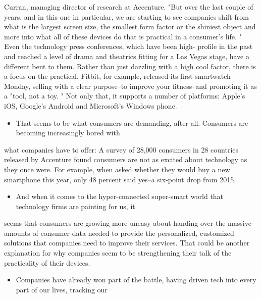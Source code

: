 \documentclass[UTF8,11pt]{ctexart}
\begin{document}
Curran, managing director of research at Accenture. "But over the last couple of years, and in this one in particular, we are starting to see companies shift from what is the largest screen size, the smallest form factor or the shiniest object and more into what all of these devices do that is practical in a consumer's life. " Even the technology press conferences, which have been high- profile in the past and reached a level of drama and theatrics fitting for a Las Vegas stage, have a different bent to them. Rather than just dazzling with a high cool factor, there is a focus on the practical. Fitbit, for example, released its first smartwatch Monday, selling with a clear purpose--to improve your fitness--and promoting it as a "tool, not a toy. " Not only that, it supports a number of platforms: Apple's iOS, Google's Android and Microsoft's Windows phone.


\begin{itemize}[leftmargin=2em,itemsep=.2em,topsep=.4em]\item[G.] That seems to be what consumers are demanding, after all. Consumers are becoming increasingly bored with
\end{itemize}

what companies have to offer: A survey of 28,000 consumers in 28 countries released by Accenture found consumers are not as excited about technology as they once were. For example, when asked whether they would buy a new smartphone this year, only 48 percent said yes--a six-point drop from 2015.


\begin{itemize}[leftmargin=2em,itemsep=.2em,topsep=.4em]\item[H.] And when it comes to the hyper-connected super-smart world that technology firms are painting for us, it
\end{itemize}

seems that consumers are growing more uneasy about handing over the massive amounts of consumer data needed to provide the personalized, customized solutions that companies need to improve their services. That could be another explanation for why companies seem to be strengthening their talk of the practicality of their devices.


\begin{itemize}[leftmargin=2em,itemsep=.2em,topsep=.4em]\item[I.] Companies have already won part of the battle, having driven tech into every part of our lives, tracking our
\end{itemize}
\end{document}
